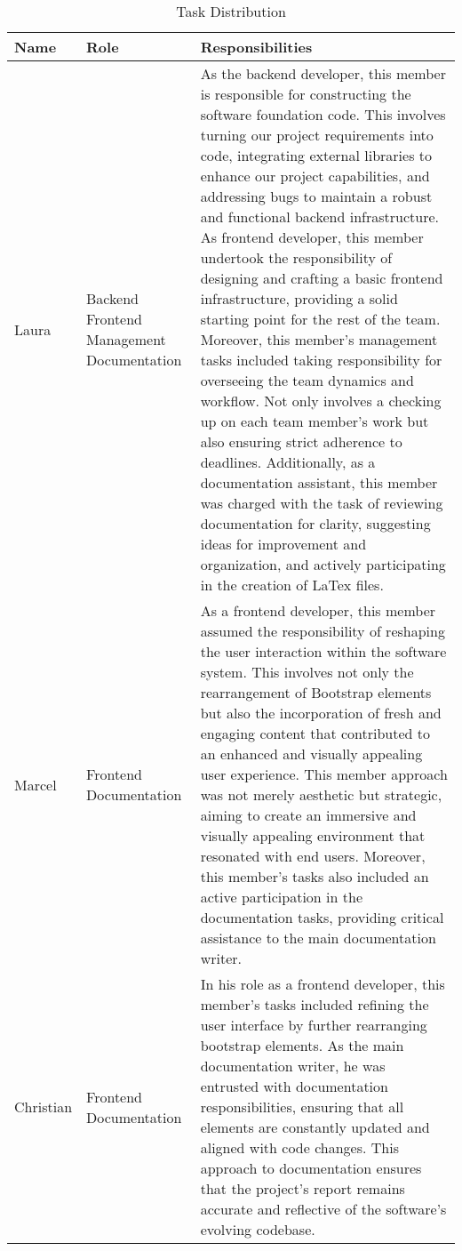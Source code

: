 \documentclass[conference]{IEEEtran}
\begin{document}
\begin{table}[H]
\centering
\begin{tabular}{| p{1cm}|p{1.5cm}|p{5cm} |}
\hline
\textbf{Name} & \textbf{Role} & \textbf{Responsibilities}\\

\hline
Laura & Backend Frontend Management Documentation & 
As the backend developer, this member is responsible for constructing the software foundation code. This involves turning our project requirements into code, integrating external libraries to enhance our project capabilities, and addressing bugs to maintain a robust and functional backend infrastructure.
As frontend developer, this member undertook the responsibility of designing and crafting a basic frontend infrastructure, providing a solid starting point for the rest of the team.
Moreover, this member’s management tasks included taking responsibility for overseeing the team dynamics and workflow. Not only involves a checking up on each team member’s work but also ensuring strict adherence to deadlines.
Additionally, as a documentation assistant, this member was charged with the task of reviewing documentation for clarity, suggesting ideas for improvement and organization, and actively participating in the creation of LaTex files.\\

\hline
Marcel & Frontend Documentation & 
As a frontend developer, this member assumed the responsibility of reshaping the user interaction within the software system. This involves not only the rearrangement of Bootstrap elements but also the incorporation of fresh and engaging content that contributed to an enhanced and visually appealing user experience. This member approach was not merely aesthetic but strategic, aiming to create an immersive and visually appealing environment that resonated with end users.
Moreover, this member’s tasks also included an active participation in the documentation tasks, providing critical assistance to the main documentation writer.\\

\hline
Christian & Frontend Documentation & 
In his role as a frontend developer, this member’s tasks included refining the user interface by further rearranging bootstrap elements.
As the main documentation writer, he was entrusted with documentation responsibilities, ensuring that all elements are constantly updated and aligned with code changes. This approach to documentation ensures that the project’s report remains accurate and reflective of the software’s evolving codebase.\\

\hline
\end{tabular}
\caption{Task Distribution}
\label{tab1}
\end{table}
\end{document}
